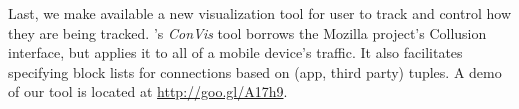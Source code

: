 Last, we make available a new visualization tool for user to track and control how 
they are being tracked. \platname{}'s \emph{ConVis} tool borrows the Mozilla project's Collusion 
interface, but applies it to all of a mobile device's traffic. It also facilitates specifying block lists for connections
 based on (app, third party) tuples. A demo of our tool is located at \url{http://goo.gl/A17h9}.


%



